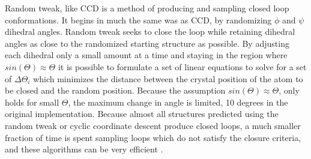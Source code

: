 Random tweak, like CCD is a method of producing and sampling closed loop conformations.
It begins in much the same was as CCD, by randomizing $\phi$ and $\psi$ dihedral angles.
Random tweak seeks to close the loop while retaining dihedral angles as close to the randomized starting structure as possible.
By adjusting each dihedral only a small amount at a time and staying in the region where $sin(\Theta) \approx \Theta$ it is possible to formulate a set of linear equations to solve for a set of $\Delta\Theta_{i}$ which minimizes the distance between the crystal position of the atom to be closed and the random position.
Because the assumption $sin(\Theta) \approx \Theta$, only holds for small $\Theta$, the maximum change in angle is limited, 10 degrees in the original implementation.
Because almost all structures predicted using the random tweak or cyclic coordinate descent produce closed loops, a much smaller fraction of time is spent sampling loops which do not satisfy the closure criteria, and these algorithms can be very efficient \cite{fine1986predicting,shenkin1987predicting}.
